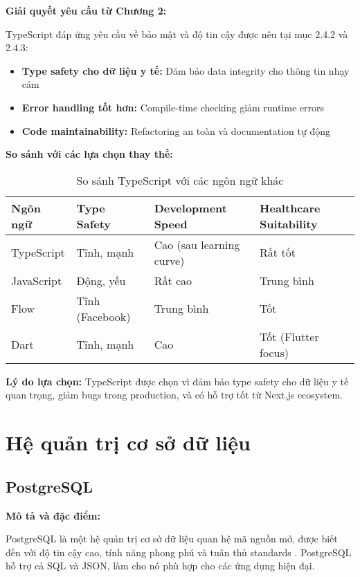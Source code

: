 \documentclass[../DoAn.tex]{subfiles}
\begin{document}
\textbf{Giải quyết yêu cầu từ Chương 2:}

TypeScript đáp ứng yêu cầu về bảo mật và độ tin cậy được nêu tại mục 2.4.2 và 2.4.3:
\begin{itemize}
    \item \textbf{Type safety cho dữ liệu y tế:} Đảm bảo data integrity cho thông tin nhạy cảm
    \item \textbf{Error handling tốt hơn:} Compile-time checking giảm runtime errors
    \item \textbf{Code maintainability:} Refactoring an toàn và documentation tự động
\end{itemize}

\textbf{So sánh với các lựa chọn thay thế:}

\begin{table}[H]
\centering
\begin{tabular}{|p{3cm}|p{3cm}|p{3cm}|p{4cm}|}
\hline
\textbf{Ngôn ngữ} & \textbf{Type Safety} & \textbf{Development Speed} & \textbf{Healthcare Suitability} \\
\hline
TypeScript & Tĩnh, mạnh & Cao (sau learning curve) & Rất tốt \\
\hline
JavaScript & Động, yếu & Rất cao & Trung bình \\
\hline
Flow & Tĩnh (Facebook) & Trung bình & Tốt \\
\hline
Dart & Tĩnh, mạnh & Cao & Tốt (Flutter focus) \\
\hline
\end{tabular}
\caption{So sánh TypeScript với các ngôn ngữ khác}
\end{table}

\textbf{Lý do lựa chọn:} TypeScript được chọn vì đảm bảo type safety cho dữ liệu y tế quan trọng, giảm bugs trong production, và có hỗ trợ tốt từ Next.js ecosystem.

\section{Hệ quản trị cơ sở dữ liệu}
\label{section:3.3}

\subsection{PostgreSQL}
\label{subsection:3.3.1}

\textbf{Mô tả và đặc điểm:}

PostgreSQL là một hệ quản trị cơ sở dữ liệu quan hệ mã nguồn mở, được biết đến với độ tin cậy cao, tính năng phong phú và tuân thủ standards \cite{postgresql}. PostgreSQL hỗ trợ cả SQL và JSON, làm cho nó phù hợp cho các ứng dụng hiện đại.
\end{document}

